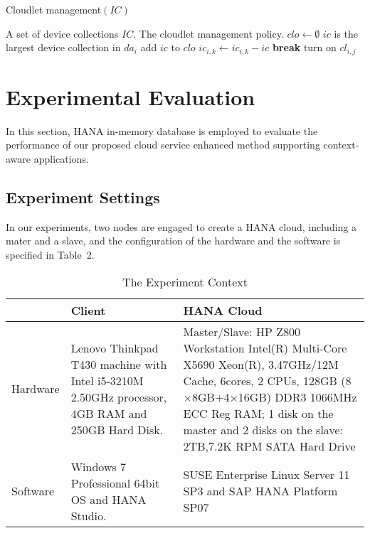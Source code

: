 \documentclass{llncs}
\begin{document}
\begin{algorithm}
\caption{Cloudlet management$(IC)$}
\begin{algorithmic}[1]
    \REQUIRE A set of device collections $IC$.
    \ENSURE The cloudlet management policy.
    \STATE $clo \gets \emptyset$
        \WHILE{$\TRUE$}
            \STATE $ic$ is the largest device collection in $da_i$
                \STATE add $ic$ to $clo$
                    \STATE $ic_{i,k} \gets ic_{i,k} - ic$
                \ENDFOR
            \ELSE
                \STATE \textbf{break}
            \ENDIF
        \ENDWHILE
    \ENDFOR
            \STATE turn on $cl_{i,j}$
        \ENDIF
    \ENDFOR
\end{algorithmic}
\end{algorithm}
%
\section{Experimental Evaluation}
%
In this section, HANA in-memory database is employed to evaluate the performance of our proposed cloud service enhanced method supporting context-aware applications.
%
\subsection{Experiment Settings}
%
In our experiments, two nodes are engaged to create a HANA cloud, including a mater and a slave, and the configuration of the hardware and the software is specified in Table~2.

\begin{table}
\caption{The Experiment Context}
\begin{center}
\begin{tabular}{l|m{5cm}|m{5cm}}
\hline
 & \textbf{Client} & \textbf{HANA Cloud}\\
\hline
Hardware & Lenovo Thinkpad T430 machine with Intel i5-3210M 2.50GHz processor, 4GB RAM and 250GB Hard Disk. & Master/Slave: HP Z800 Workstation Intel(R) Multi-Core X5690 Xeon(R), 3.47GHz/12M Cache, 6cores, 2 CPUs, 128GB (8$\times$8GB+4$\times$16GB) DDR3 1066MHz ECC Reg RAM;
1 disk on the master and 2 disks on the slave: 2TB,7.2K RPM SATA Hard Drive\\
\hline
Software & Windows 7 Professional 64bit OS and HANA Studio. & SUSE Enterprise Linux Server 11 SP3 and SAP HANA Platform SP07\\
\hline
\end{tabular}
\end{center}
\end{table}
\end{document}
